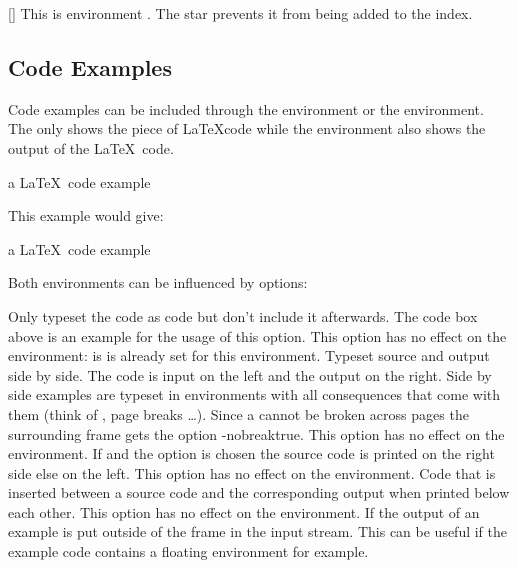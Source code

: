 \documentclass[load-preamble+,babel-options={ngerman,english}]{cnltx-doc}
\begin{document}
\begin{example}
  \begin{environments}
    []
      This is environment .  The star prevents it from being
      added to the index.
  \end{environments}
\end{example}

\subsection{Code Examples}\label{sec:usage:examples}
Code examples can be included through the  environment or the
 environment.  The  only shows the piece of
\LaTeX code while the  environment also shows the output of the
\LaTeX\ code.
\begin{sourcecode}
  \begin{example}
    a \LaTeX\ code example
  \end{example}
\end{sourcecode}
This example would give:

\begin{example}
  a \LaTeX\ code example
\end{example}

Both environments can be influenced by options:
\begin{options}
    Only typeset the code as code but don't include it afterwards.  The
    code box above is an example for the usage of this option.  This option
    has no effect on the  environment: is is already set for
    this environment.
    Typeset source and output side by side.  The code is input on the left and
    the output on the right.  Side by side examples are typeset in
     environments with all consequences that come with them
    (think of , page breaks \ldots).  Since a 
    cannot be broken across pages the surrounding  frame gets
    the option \keyis*-{nobreak}{true}.  This option has no effect on the
     environment.
    If  and the option  is chosen the source
    code is printed on the right side else on the left.  This option has no
    effect on the  environment.
    Code that is inserted between a source code and the corresponding output
    when printed below each other.  This option has no effect on the
     environment.
    If  the output of an example is put outside
    of the frame in the input stream.  This can be useful if the example code
    contains a floating environment for example.
\end{options}
\end{document}
